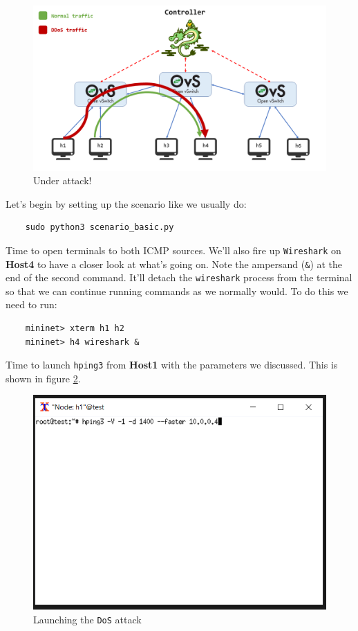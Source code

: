 \documentclass[12pt]{article}
\begin{document}
		\begin{figure}[!htb]
			\centering
			\includegraphics[width=\linewidth]{scenario_ddos.png}
			\caption{Under attack!}
			\label{f:dos_atk}
		\end{figure}
        
        \newpage
		Let's begin by setting up the scenario like we usually do:

		\begin{verbatim}
	sudo python3 scenario_basic.py
		\end{verbatim}

		Time to open terminals to both ICMP sources. We'll also fire up \texttt{Wireshark} on \textbf{Host4} to have a closer look at what's going on. Note the ampersand (\texttt{\&}) at the end of the second command. It'll detach the \texttt{wireshark} process from the terminal so that we can continue running commands as we normally would. To do this we need to run:

		\begin{verbatim}
	mininet> xterm h1 h2
	mininet> h4 wireshark &
		\end{verbatim}


        Time to launch \texttt{hping3} from \textbf{Host1} with the parameters we discussed. This is shown in figure \ref{f:hping3_ex}.
		\begin{figure}[!htb]
			\centering
			\includegraphics[width=\linewidth]{launch_hping3.png}
			\caption{Launching the \texttt{DoS} attack}
			\label{f:hping3_ex}
		\end{figure}
\end{document}
